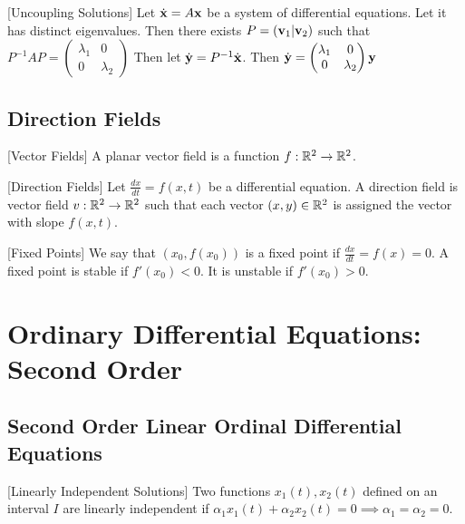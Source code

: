 \documentclass[a4paper]{article}
\begin{document}
\begin{thm}{}{}[Uncoupling Solutions] Let $\dot{\vb{x}}=A\vb{x}$ be a system of differential equations. Let it has distinct eigenvalues. Then there exists $P=(\vb{v}_1|\vb{v}_2)$ such that $P^{-1}AP=\begin{pmatrix}
\lambda_1 & 0\\
0 & \lambda_2
\end{pmatrix}$ Then let $\dot{\vb{y}}=P^{-1}\dot{\vb{x}}$. Then $\dot{\vb{y}}=\begin{pmatrix}
\lambda_1 & 0\\
0 & \lambda_2
\end{pmatrix}\vb{y}$
\end{thm}

\subsection{Direction Fields}
\begin{defn}{}{}[Vector Fields] A planar vector field is a function $f:\mathbb{R}^2\to\mathbb{R}^2$. 
\end{defn}

\begin{defn}{}{}[Direction Fields] Let $\frac{dx}{dt}=f(x,t)$ be a differential equation. A direction field is vector field $v:\mathbb{R}^2\to\mathbb{R}^2$ such that each vector $(x,y)\in\mathbb{R}^2$ is assigned the vector with slope $f(x,t)$. 
\end{defn}

\begin{defn}{}{}[Fixed Points] We say that $(x_0,f(x_0))$ is a fixed point if $\frac{dx}{dt}=f(x)=0$. A fixed point is stable if $f'(x_0)<0$. It is unstable if $f'(x_0)>0$. 
\end{defn}

\pagebreak
\section{Ordinary Differential Equations: Second Order}
\subsection{Second Order Linear Ordinal Differential Equations}
\begin{defn}{}{}[Linearly Independent Solutions] Two functions $x_1(t),x_2(t)$ defined on an interval $I$ are linearly independent if $\alpha_1x_1(t)+\alpha_2x_2(t)=0\implies\alpha_1=\alpha_2=0$. 
\end{defn}
\end{document}
